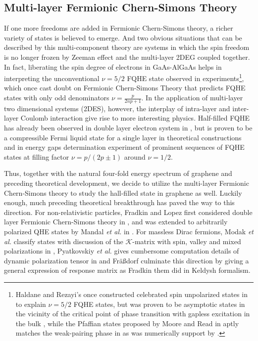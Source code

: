 \documentclass[bachelor,english,numbers]{ustcthesis}
\begin{document}
	\subsection{Multi-layer Fermionic Chern-Simons Theory}
		\indent\par If one more freedoms are added in Fermionic Chern-Simons theory, a richer variety of states is believed to emerge. And two obvious situations that can be described by this multi-component theory are systems in which the spin freedom is no longer frozen by Zeeman effect and the multi-layer 2DEG coupled together. In fact, liberating the spin degree of electrons in GaAs-AlGaAs helps in interpreting the unconventional $\nu=5/2$ FQHE state observed in experiments\footnote{Haldane and Rezayi's once constructed celebrated spin unpolarized states in \cite{haldane1988spin} to explain $\nu=5/2$ FQHE states, but was proven to be asymptotic states in the vicinity of the critical point of phase transition with gapless excitation in the bulk \cite{read2000paired}, while the Pfaffian states proposed by Moore and Read in \cite{moore1991nonabelions} aptly matches the weak-pairing phase in \cite{read2000paired} as was numerically support by \cite{morf1998transition}.}, which once cast doubt on Fermionic Chern-Simons Theory that predicts FQHE states with only odd denominators $\nu=\frac{p}{2np+1}$. In the application of multi-layer two dimensional systems (2DES), however, the interplay of intra-layer and inter-layer Coulomb interaction give rise to more interesting physics. Half-filled FQHE has already been observed in double layer electron system in \cite{suen1992observation}, but is proven to be a compressible Fermi liquid state for a single layer in theoretical constructions \cite{stern1995singularities} and in energy gaps determination experiment of prominent sequences of FQHE states \cite{du1993experimental} at filling factor $\nu=p/(2p\pm1)$ around $\nu=1/2$.\par
		Thus, together with the natural four-fold energy spectrum of graphene and preceding theoretical development, we decide to utilize the multi-layer Fermionic Chern-Simons theory to study the hall-filled state in graphene as well. Luckily enough, much preceding theoretical breakthrough has paved the way to this direction. For non-relativistic particles, Fradkin and Lopez first considered double layer Fermionic Chern-Simons theory in \cite{lopez1995fermionic}, and was extended to arbitrarily polarized QHE states by Mandal {\it et al.} in \cite{mandal1996theory}. For massless Dirac fermions,  Modak {\it et al.} classify states with discussion of the $\mathcal{K}$-matrix with spin, valley and mixed polarizations in \cite{modak2011fermionic}, Pyatkovskiy {\it et al.} gives cumbersome computation details of dynamic polarization tensor in \cite{pyatkovskiy2011dynamical} and Fr{\"a}{\ss}dorf culminate this direction by giving a general expression of response matrix as Fradkin them did in Keldysh formalism.
\end{document}
